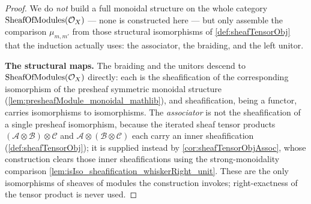 \begin{proof}
  We do \emph{not} build a full monoidal structure on the whole category
  \(\mathrm{SheafOfModules}(\mathcal{O}_X)\) --- none is constructed here --- but only assemble
  the comparison \(\mu_{m,m'}\) from those structural isomorphisms of
  \cref{def:sheafTensorObj} that the induction actually uses: the associator,
  the braiding, and the left unitor.

  \textbf{The structural maps.} The braiding and the unitors descend to
  \(\mathrm{SheafOfModules}(\mathcal{O}_X)\) directly: each is the sheafification of the
  corresponding isomorphism of the presheaf symmetric monoidal structure
  (\cref{lem:presheafModule_monoidal_mathlib}), and sheafification, being a
  functor, carries isomorphisms to isomorphisms. The \emph{associator} is not
  the sheafification of a single presheaf isomorphism, because the iterated
  sheaf tensor products
  \((\mathcal{A} \otimes \mathcal{B}) \otimes \mathcal{C}\) and
  \(\mathcal{A} \otimes (\mathcal{B} \otimes \mathcal{C})\) each carry an inner
  sheafification (\cref{def:sheafTensorObj}); it is supplied instead by
  \cref{cor:sheafTensorObjAssoc}, whose construction clears those inner
  sheafifications using the strong-monoidality comparison
  \cref{lem:isIso_sheafification_whiskerRight_unit}. These are the only
  isomorphisms of sheaves of modules the construction invokes; right-exactness
  of the tensor product is never used.


\end{proof}
